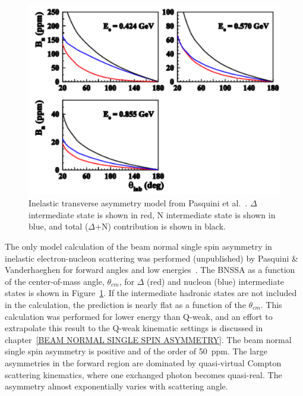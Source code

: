 \begin{figure}[!h]
	\begin{center}
	\includegraphics[width=15.0cm]{figures/PasquiniInelasticTransverseAsymmetryModel}
	\end{center}
	\caption
	{Inelastic transverse asymmetry model from Pasquini et al.~\cite{presentation:pasquini_Mainz}. $\Delta$ intermediate state is shown in red, N intermediate state is shown in blue, and total ($\Delta$+N) contribution is shown in black.}
	\label{fig:PasquiniInelasticTransverseAsymmetryModel}
\end{figure}


The only model calculation of the beam normal single spin asymmetry in inelastic electron-nucleon scattering was performed (unpublished) by Pasquini \& Vanderhaeghen for forward angles and low energies~\cite{presentation:pasquini_Mainz, presentation:CarlCarlson_qweak}. The BNSSA as a function of the center-of-mass angle, $\theta_{cm}$, for $\Delta$ (red) and nucleon (blue) intermediate states is shown in Figure~\ref{fig:PasquiniInelasticTransverseAsymmetryModel}. If the intermediate hadronic states are not included in the calculation, the prediction is nearly flat as a function of the $\theta_{cm}$. This calculation was performed for lower energy than Q-weak, and an effort to extrapolate this result to the Q-weak kinematic settings is discussed in chapter~\ref{BEAM NORMAL SINGLE SPIN ASYMMETRY}. The beam normal single spin asymmetry is positive and of the order of 50~ppm. The large asymmetries in the forward region are dominated by quasi-virtual Compton scattering kinematics, where one exchanged photon becomes quasi-real. The asymmetry almost exponentially varies with scattering angle. 

